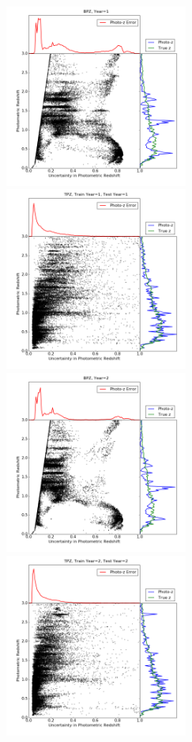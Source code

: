 \documentclass[DM,lsstdraft,toc]{lsstdoc}
\begin{document}
\begin{figure}
\begin{center}
\includegraphics[width=6cm,trim={1cm 1cm 1cm 0cm}, clip]{figures/zp_zpe_bpz_euclid_1_2.png}
\includegraphics[width=6cm,trim={1cm 1cm 1cm 0cm}, clip]{figures/zp_zpe_tpz_euclid_1_1_2.png}
\includegraphics[width=6cm,trim={1cm 1cm 1cm 0cm}, clip]{figures/zp_zpe_bpz_euclid_2_2.png}
\includegraphics[width=6cm,trim={1cm 1cm 1cm 0cm}, clip]{figures/zp_zpe_tpz_euclid_2_2_2.png}

\end{center}
\end{figure}
\end{document}
